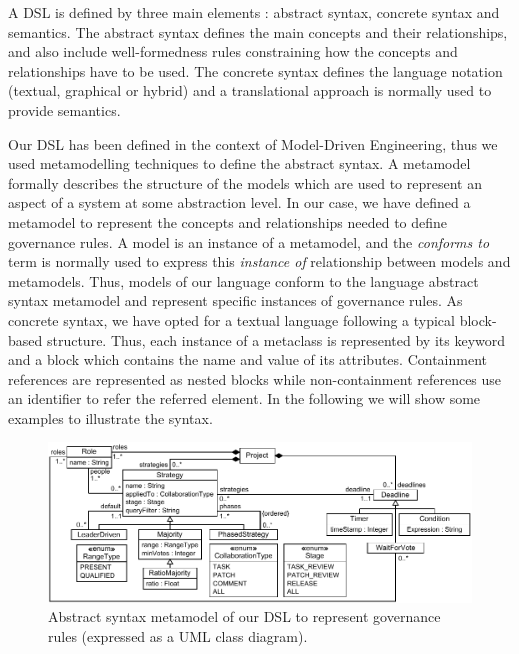 A DSL is defined by three main elements \cite{bib:kleppe}: abstract syntax, concrete syntax and semantics. The abstract syntax defines the main concepts and their relationships, and also include well-formedness rules constraining how the concepts and relationships have to be used. The concrete syntax defines the language notation (textual, graphical or hybrid) and a translational approach is normally used to provide semantics.

Our DSL has been defined in the context of Model-Driven Engineering, thus we used metamodelling techniques \cite{bib:Brambilla} to define the abstract syntax. A metamodel formally describes the structure of the models which are used to represent an aspect of a system at some abstraction level. In our case, we have defined a metamodel to represent the concepts and relationships needed to define governance rules. A model is an instance of a metamodel, and the \emph{conforms to} term is normally used to express this \emph{instance of} relationship between models and metamodels. Thus, models of our language conform to the language abstract syntax metamodel and represent specific instances of governance rules. As concrete syntax, we have opted for a textual language following a typical block-based structure. Thus, each instance of a metaclass is represented by its keyword and a block which contains the name and value of its attributes. Containment references are represented as nested blocks while non-containment references use an identifier to refer the referred element. In the following we will show some examples to illustrate the syntax.

\begin{figure}[t]
\centering
\includegraphics[width=\textwidth]{./figures/decisionStrategy}
\caption{Abstract syntax metamodel of our DSL to represent governance rules (expressed as a UML class diagram).}
\label{fig:decisionStrategy}
\end{figure}

